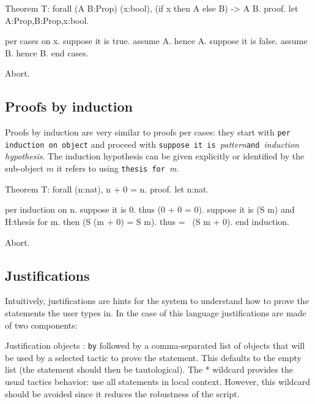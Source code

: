 \begin{coq_eval}
Theorem T: forall (A B:Prop) (x:bool), (if x then A else B) -> A \/ B.
proof.
let A:Prop,B:Prop,x:bool.
\end{coq_eval} 
\begin{coq_example}
per cases on x.
suppose it is true.
  assume A.
  hence A.
suppose it is false.
  assume B.
  hence B.
end cases.
\end{coq_example}
\begin{coq_eval}
Abort.
\end{coq_eval}

\subsection{Proofs by induction} 

Proofs by induction are very similar to proofs per cases: they start
with {\tt per induction on }{\tt object} and proceed with {\tt suppose
  it is }\emph{pattern}{\tt and }\emph{induction hypothesis}. The
induction hypothesis can be given explicitly or identified by the
sub-object $m$ it refers to using {\tt thesis for }\emph{m}. 

\begin{coq_eval}
Theorem T: forall (n:nat), n + 0 = n.
proof.
let n:nat.
\end{coq_eval} 
\begin{coq_example}
per induction on n.
suppose it is 0.
  thus (0 + 0 = 0).
suppose it is (S m) and H:thesis for m.
  then (S (m + 0) = S m).
  thus =~ (S m + 0).
end induction.
\end{coq_example}
\begin{coq_eval}
Abort.
\end{coq_eval}

\subsection{Justifications}\label{justifications}


Intuitively, justifications are hints for the system to understand how
to prove the statements the user types in. In the case of this
language justifications are made of two components:

Justification objects : {\texttt{by}} followed by a comma-{}separated
list of objects that will be used by a selected tactic to prove the
statement. This defaults to the empty list (the statement should then
be tautological). The * wildcard provides the usual tactics behavior:
use all statements in local context. However, this wildcard should be
avoided since it reduces the robustness of the script.


